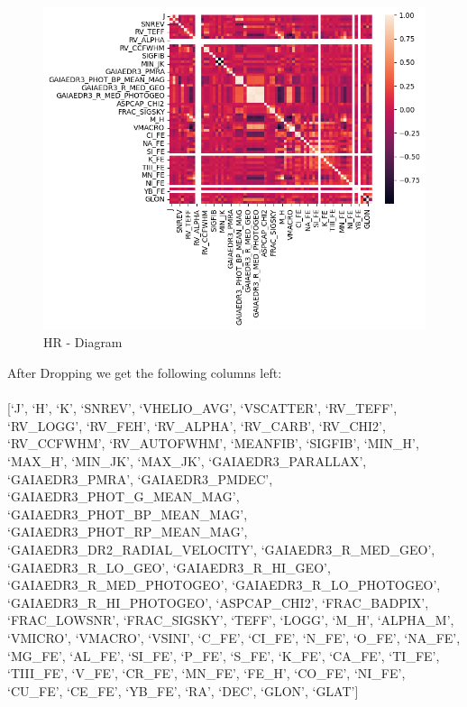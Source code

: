 \documentclass{article}
\begin{document}
\begin{figure}[H]
    \centering
    \label{fig:6}
    \includegraphics[width=\textwidth]{Images/CorrelationMatrixBetweenNumerical1.png}
    \caption{HR - Diagram}
\end{figure}


After Dropping we get the following columns left:
\paragraph{}
{[}`J', `H', `K',
`SNREV', `VHELIO\_AVG', `VSCATTER', `RV\_TEFF', `RV\_LOGG', `RV\_FEH',
`RV\_ALPHA', `RV\_CARB', `RV\_CHI2', `RV\_CCFWHM', `RV\_AUTOFWHM',
`MEANFIB', `SIGFIB', `MIN\_H', `MAX\_H', `MIN\_JK', `MAX\_JK',
`GAIAEDR3\_PARALLAX', `GAIAEDR3\_PMRA', `GAIAEDR3\_PMDEC',
`GAIAEDR3\_PHOT\_G\_MEAN\_MAG', `GAIAEDR3\_PHOT\_BP\_MEAN\_MAG',
`GAIAEDR3\_PHOT\_RP\_MEAN\_MAG', `GAIAEDR3\_DR2\_RADIAL\_VELOCITY',
`GAIAEDR3\_R\_MED\_GEO', `GAIAEDR3\_R\_LO\_GEO', `GAIAEDR3\_R\_HI\_GEO',
`GAIAEDR3\_R\_MED\_PHOTOGEO', `GAIAEDR3\_R\_LO\_PHOTOGEO',
`GAIAEDR3\_R\_HI\_PHOTOGEO', `ASPCAP\_CHI2', `FRAC\_BADPIX',
`FRAC\_LOWSNR', `FRAC\_SIGSKY', `TEFF', `LOGG', `M\_H', `ALPHA\_M',
`VMICRO', `VMACRO', `VSINI', `C\_FE', `CI\_FE', `N\_FE', `O\_FE',
`NA\_FE', `MG\_FE', `AL\_FE', `SI\_FE', `P\_FE', `S\_FE', `K\_FE',
`CA\_FE', `TI\_FE', `TIII\_FE', `V\_FE', `CR\_FE', `MN\_FE', `FE\_H',
`CO\_FE', `NI\_FE', `CU\_FE', `CE\_FE', `YB\_FE', `RA', `DEC', `GLON',
`GLAT'{]}
\end{document}

